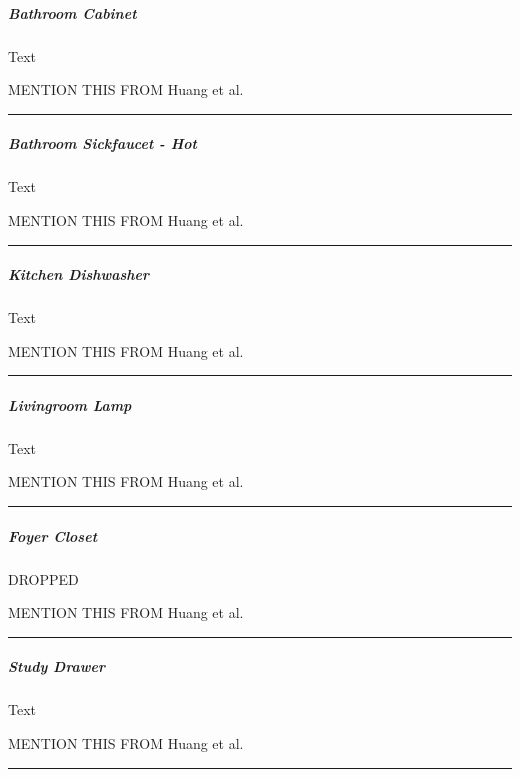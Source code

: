 \documentclass[11pt]{article}
\begin{document}
    \hypertarget{bathroom-cabinet}{%
\subparagraph{Bathroom Cabinet}\label{bathroom-cabinet}}

    Text

    MENTION THIS FROM Huang et al.~

\begin{center}\rule{0.5\linewidth}{\linethickness}\end{center}

    \hypertarget{bathroom-sickfaucet---hot}{%
\subparagraph{Bathroom Sickfaucet -
Hot}\label{bathroom-sickfaucet---hot}}

    Text

    MENTION THIS FROM Huang et al.~

\begin{center}\rule{0.5\linewidth}{\linethickness}\end{center}

    \hypertarget{kitchen-dishwasher}{%
\subparagraph{Kitchen Dishwasher}\label{kitchen-dishwasher}}

    Text

    MENTION THIS FROM Huang et al.~

\begin{center}\rule{0.5\linewidth}{\linethickness}\end{center}

    \hypertarget{livingroom-lamp}{%
\subparagraph{Livingroom Lamp}\label{livingroom-lamp}}

    Text

    MENTION THIS FROM Huang et al.~

\begin{center}\rule{0.5\linewidth}{\linethickness}\end{center}

    \hypertarget{foyer-closet}{%
\subparagraph{Foyer Closet}\label{foyer-closet}}

    DROPPED

    MENTION THIS FROM Huang et al.~

\begin{center}\rule{0.5\linewidth}{\linethickness}\end{center}

    \hypertarget{study-drawer}{%
\subparagraph{Study Drawer}\label{study-drawer}}

    Text

    MENTION THIS FROM Huang et al.~

\begin{center}\rule{0.5\linewidth}{\linethickness}\end{center}
\end{document}
